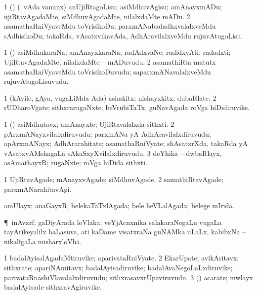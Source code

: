\bentry
{}
\gl{\sakirx}
\bmng
\bnum
\num{1} (\nAyxshA) (\kanmu\ vAda \mo vanunx) anUjiRtagoLisu; asiMdhuvAgisu; amAnayxmADu; ujiRtavAgadaMte, siMdhuvAgadaMte, nilalxdaMte mADu. 
\num{2} asamathaRniVyaveMdu toVrisikoDu; parxmANabadadhxvalalxveMdu sAdhisikoDu; takaRda, vAsatxvikavAda, AdhAravilalxveMdu rujuvAtugoLisu. 
\enum
\emng
\eentry

\bentry
{}
\gl{\nA}
\bmng
\bnum
\num{1} (\nAyxshA) asiMdhukaraNa; amAnayxkaraNa; radAdxvaNe; radidxyAti; radadxti; UjiRtavAgadaMte, nilalxdaMte -- mADuvudu. 
\num{2} asamathiRta matutx asamathaRniVyaveMdu toVrisikoDuvudu; saparxmANavalalxveMdu rujuvAtugoLisuvudu. 
\enum
\emng
\eentry

\bentry
{}
\gl{\nA}
\bmng
\bnum
\num{1} (kAyile, gAya, \mo vugaLiMda Ada) ashakitx; nishayxkitx; dubaRlate. 
\num{2} rUDharoVgate; sithxrarugaNxte; beVrubiTaTx, guNavAgada roVga hiDidiruvike. 
\enum
\emng
\eentry

\bentry
{}
\gl{\nA}
\bmng
\bnum
\num{1} (\nAyxshA) asiMdhutavx; amAnayxte; UjiRtavalalxda sithxti. 
\num{2} pArxmANayxvilalxdiruvudu; parxmANa yA AdhAravilalxdiruvudu; apArxmANayx; AdhArarahitate; asamathaRniVyate; shAsatxrXda, takaRda yA vAsatxvAMshagaLa sAkaSxyXvilalxdiruvudu. 
\num{3} deYhika -- dwbaRlayx, asAmathayxR; rugaNxte; roVga hiDida sithxti. 
\enum
\emng
\eentry

\bentry
{}
\gl{\kirxvi}
\bmng
\bnum
\num{1} UjiRtavAgade; mAnayxvAgade; siMdhuvAgade. 
\num{2} samathiRtavAgade; parxmANarahitavAgi. 
\enum
\emng
\eentry

\bentry
{}
\gl{\gu}
\bmng
amUlayx; anaGayxR; belekaTaTxlAgada; bele heVLalAgada; belege mIrida. 
\emng
\eentry

\bentry
{}
\gl{\nA}
\bmng
\P\ inAvxrf; gaDiyArada loVlaka; veYjAcnxnika salakaraNegaLu \mo vugaLa tayArikeyalilx baLasuva, ati kaDame visatxraNa guNAMka uLaLx, kabibxNa -- nikalfgaLa misharxloVha. 
\emng
\eentry

\bentry
{}
\gl{\nA}
\bmng
\bnum
\num{1} badalAyisalAgadaMtiruvike; aparivataRniVyate. 
\num{2} EkarUpate; avikAritavx; sithxrate; apariNAmitavx; badalAyisadiruvike; badalAvaNegoLaLxdiruvike; parivataRnashiVlavalalxdiruvudu; sithxrasavxrUpaviruvudu. 
\num{3} (\ga) acarate; mwlayx badalAyisade sithxravAgiruvike. 
\enum
\emng
\eentry

